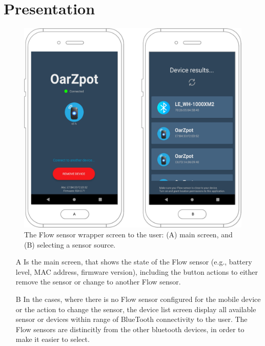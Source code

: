 \section{Presentation}
\begin{figure}
    \centering
    \includegraphics[scale=0.3]{images/flow_app.pdf}
    \caption{The Flow sensor wrapper screen to the user: (A) main screen, and (B) selecting a sensor source.}
    \label{fig:flowapp}
\end{figure}

\begin{itemize}
    \item[A] Is the main screen, that shows the state of the Flow sensor (e.g., battery level, MAC address, firmware version), including the button actions to either remove the sensor or change to another Flow sensor. 
    \item[B] In the cases, where there is no Flow sensor configured for the mobile device or the action to change the sensor, the device list screen display all available sensor or devices within range of BlueTooth connectivity to the user. The Flow sensors are distincitly from the other bluetooth devices, in order to make it easier to select.
\end{itemize}